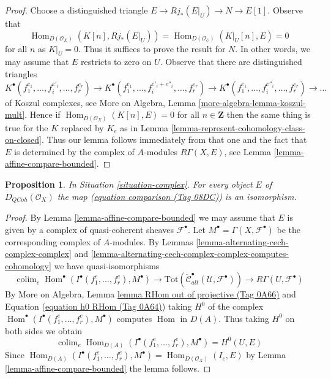 \documentclass{amsart}
\theoremstyle{plain}
\newtheorem{proposition}[subsection]{Proposition}
\theoremstyle{definition}
\theoremstyle{remark}
\numberwithin{equation}{subsection}
\def\colim{\mathop{\mathrm{colim}}\nolimits}
\def\Hom{\mathop{\mathrm{Hom}}\nolimits}
\def\QCoh{\mathit{QCoh}}
\begin{document}
\begin{proof}
Choose a distinguished triangle $E \to Rj_*(E|_U) \to N \to E[1]$.
Observe that
$$
\Hom_{D(\mathcal{O}_X)}(K[n], Rj_*(E|_U)) =
\Hom_{D(\mathcal{O}_U)}(K|_U[n], E) = 0
$$
for all $n$ as $K|_U = 0$. Thus it suffices to prove the result for
$N$. In other words, we may assume that $E$ restricts to zero on $U$.
Observe that there are distinguished triangles
$$
K^\bullet(f_1^{e_1}, \ldots, f_i^{e'_i}, \ldots, f_r^{e_r}) \to
K^\bullet(f_1^{e_1}, \ldots, f_i^{e'_i + e''_i}, \ldots, f_r^{e_r}) \to
K^\bullet(f_1^{e_1}, \ldots, f_i^{e''_i}, \ldots, f_r^{e_r}) \to \ldots
$$
of Koszul complexes, see
More on Algebra, Lemma \ref{more-algebra-lemma-koszul-mult}.
Hence if $\Hom_{D(\mathcal{O}_X)}(K[n], E) = 0$ for all $n \in \mathbf{Z}$
then the same thing is true for the $K$ replaced by
$K_e$ as in Lemma \ref{lemma-represent-cohomology-class-on-closed}.
Thus our lemma follows immediately from that one and the fact that $E$
is determined by the complex of $A$-modules $R\Gamma(X, E)$, see
Lemma \ref{lemma-affine-compare-bounded}.
\end{proof}


\begin{proposition}
\label{proposition-represent-cohomology-class-on-open}
In Situation \ref{situation-complex}. For every object $E$
of $D_\QCoh(\mathcal{O}_X)$ the map
(\href{https://stacks.math.columbia.edu/tag/08DC}{equation comparison (Tag 08DC)}) is an isomorphism.
\end{proposition}

\begin{proof}
By Lemma \ref{lemma-affine-compare-bounded} we may assume that $E$
is given by a complex of quasi-coherent sheaves $\mathcal{F}^\bullet$.
Let $M^\bullet = \Gamma(X, \mathcal{F}^\bullet)$ be the corresponding
complex of $A$-modules. By
Lemmas \ref{lemma-alternating-cech-complex-complex} and
\ref{lemma-alternating-cech-complex-complex-computes-cohomology}
we have quasi-isomorphisms
$$
\colim_e \Hom^\bullet(I^\bullet(f_1^e, \ldots, f_r^e), M^\bullet)
\longrightarrow
\text{Tot}(\check{\mathcal{C}}_{alt}^\bullet(\mathcal{U}, \mathcal{F}^\bullet))
\longrightarrow
R\Gamma(U, \mathcal{F}^\bullet)
$$
By More on Algebra, Lemma \href{https://stacks.math.columbia.edu/tag/0A66}{lemma RHom out of projective (Tag 0A66)} and
Equation (\href{https://stacks.math.columbia.edu/tag/0A64}{equation h0 RHom (Tag 0A64)})
taking $H^0$ of the complex
$\Hom^\bullet(I^\bullet(f_1^e, \ldots, f_r^e), M^\bullet)$
computes $\Hom$ in $D(A)$. Thus taking $H^0$ on both sides we obtain
$$
\colim_e \Hom_{D(A)}(I^\bullet(f_1^e, \ldots, f_r^e), M^\bullet)
=
H^0(U, E)
$$
Since $\Hom_{D(A)}(I^\bullet(f_1^e, \ldots, f_r^e), M^\bullet) =
\Hom_{D(\mathcal{O}_X)}(I_e, E)$ by
Lemma \ref{lemma-affine-compare-bounded} the lemma follows.
\end{proof}
\end{document}
